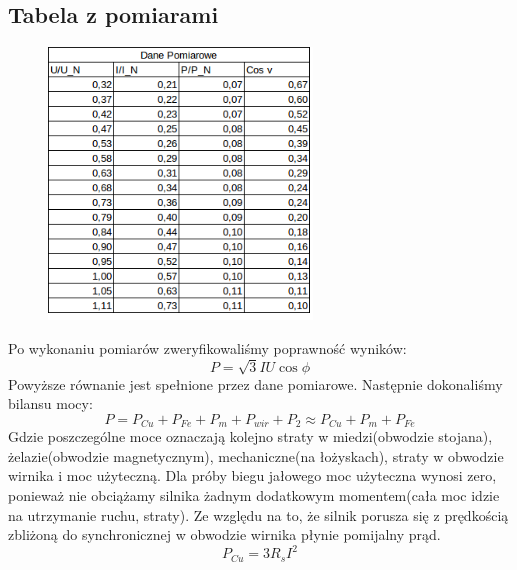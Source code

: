 \documentclass[12pt]{article}
\begin{document}
	\subsection{Tabela z pomiarami}
		\begin{figure}[H]
			\centering
			\includegraphics[width=7cm]{tabele/jalowy_tab}
		\end{figure}
Po wykonaniu pomiarów zweryfikowaliśmy poprawność wyników:
\begin{equation}
	P=\sqrt{3}IU\cos{\phi}
\end{equation}
Powyższe równanie jest spełnione przez dane pomiarowe.\newline
Następnie dokonaliśmy bilansu mocy:
\begin{equation}
	P=P_{Cu}+P_{Fe}+P_{m}+P_{wir} + P_2 \approx P_{Cu} + P_{m} + P_{Fe}
\end{equation}
Gdzie poszczególne moce oznaczają kolejno straty w miedzi(obwodzie stojana), żelazie(obwodzie magnetycznym), mechaniczne(na łożyskach), straty w obwodzie wirnika i moc użyteczną. Dla próby biegu jałowego moc użyteczna wynosi zero, ponieważ nie obciążamy silnika żadnym dodatkowym momentem(cała moc idzie na utrzymanie ruchu, straty). Ze względu na to, że silnik porusza się z prędkością zbliżoną do synchronicznej w obwodzie wirnika płynie pomijalny prąd.
\begin{equation}
	P_{Cu}=3R_sI^2
\end{equation}
\end{document}
